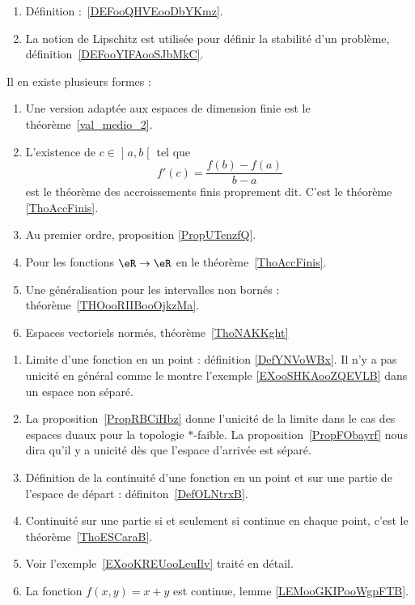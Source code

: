     \begin{enumerate}
    \item
        Définition :~\ref{DEFooQHVEooDbYKmz}.
    \item
        La notion de Lipschitz est utilisée pour définir la stabilité d'un problème, définition~\ref{DEFooYIFAooSJbMkC}.
    \end{enumerate}


    Il en existe plusieurs formes :
    \begin{enumerate}
        \item
            Une version adaptée aux espaces de dimension finie est le théorème~\ref{val_medio_2}.
        \item
        L'existence de \( c\in \mathopen] a , b \mathclose[\) tel que
            \begin{equation}
                f'(c)=\frac{ f(b)-f(a) }{ b-a }
            \end{equation}
            est le théorème des accroissements finis proprement dit. C'est le théorème \ref{ThoAccFinis}.
        \item
            Au premier ordre, proposition \ref{PropUTenzfQ}.
        \item
            Pour les fonctions \( \eR\to \eR\) en le théorème~\ref{ThoAccFinis}.
        \item
            Une généralisation pour les intervalles non bornés : théorème~\ref{THOooRIIBooOjkzMa}.
        \item
            Espaces vectoriels normés, théorème~\ref{ThoNAKKght}
    \end{enumerate}

    \label{THEMEooGVCCooHBrNNd}

\begin{enumerate}
    \item
        Limite d'une fonction en un point : définition \ref{DefYNVoWBx}. Il n'y a pas unicité en général comme le montre l'exemple \ref{EXooSHKAooZQEVLB} dans un espace non séparé.
    \item
        La proposition~\ref{PropRBCiHbz} donne l'unicité de la limite dans le cas des espaces duaux pour la topologie \( *\)-faible. La proposition~\ref{PropFObayrf} nous dira qu'il y a unicité dès que l'espace d'arrivée est séparé.
    \item
        Définition de la continuité d'une fonction en un point et sur une partie de l'espace de départ : définiton~\ref{DefOLNtrxB}.
    \item
        Continuité sur une partie si et seulement si continue en chaque point, c'est le théorème~\ref{ThoESCaraB}.
    \item
        Voir l'exemple~\ref{EXooKREUooLeuIlv} traité en détail.
    \item
        La fonction \( f(x,y)=x+y\) est continue, lemme \ref{LEMooGKIPooWgpFTB}.
\end{enumerate}

